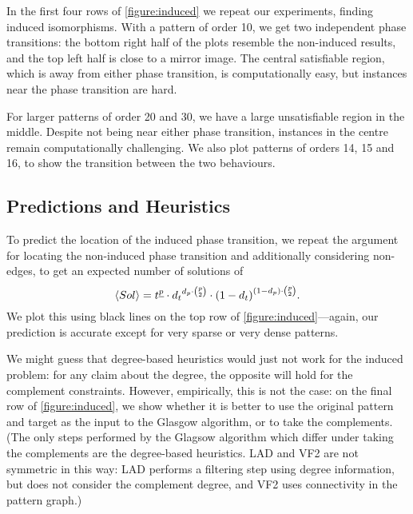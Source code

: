 \documentclass[letterpaper]{article}
\begin{document}
\begin{figure*}[t]
    
    \caption{Behaviour of algorithms on the induced variant, shown in the style
    of \cref{figure:non-induced}. The second, third and fourth rows show the number of search nodes used by the
    Glasgow, LAD and VF2 algorithms. The fifth row plots constrainedness: the darkest region is where
    $\kappa = 1$, and the lighter regions show where the problem is either over-
    or under-constrained. The final row shows when the Glasgow algorithm performs better when given
    the complements of the pattern and target graphs as inputs---the solid lines show the location
of the phase transition, and the dotted lines are $t_d=0.5$ and the $p_d=t_d$ diagonal.}\label{figure:induced}
\end{figure*}

In the first four rows of \cref{figure:induced} we repeat our experiments, finding induced
isomorphisms. With a pattern of order 10, we get two independent phase transitions: the bottom right
half of the plots resemble the non-induced results, and the top left half is close to a mirror
image. The central satisfiable region, which is away from either phase transition, is
computationally easy, but instances near the phase transition are hard.

For larger patterns of order 20 and 30, we have a large unsatisfiable region in the middle. Despite
not being near either phase transition, instances in the centre remain computationally challenging.
We also plot patterns of orders 14, 15 and 16, to show the transition between the two behaviours.

\subsection{Predictions and Heuristics}

To predict the location of the induced phase transition, we repeat the argument for locating the
non-induced phase transition and additionally considering non-edges, to get an expected number of
solutions of \[ \langle Sol \rangle = t^{\underline{p}} \cdot {d_t}^{d_p \cdot \binom{p}{2}} \cdot
{(1 - d_{t})}^{(1 - d_{p}) \cdot \binom{p}{2}} \textnormal{.} \] We plot this using black lines on
the top row of \cref{figure:induced}---again, our prediction is accurate except for very sparse or
very dense patterns.

We might guess that degree-based heuristics would just not work for the induced problem: for any
claim about the degree, the opposite will hold for the complement constraints. However, empirically,
this is not the case: on the final row of \cref{figure:induced}, we show whether it is better to use
the original pattern and target as the input to the Glasgow algorithm, or to take the complements.
(The only steps performed by the Glagsow algorithm which differ under taking the complements are
the degree-based heuristics.  LAD and VF2 are not symmetric in this way: LAD performs a filtering
step using degree information, but does not consider the complement degree, and VF2 uses
connectivity in the pattern graph.)
\end{document}
